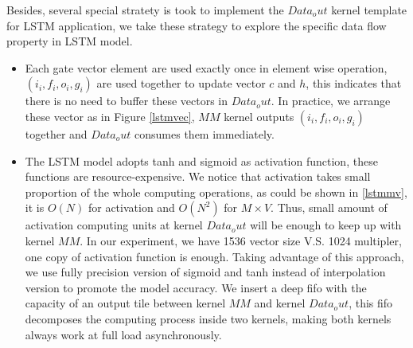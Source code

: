 \documentclass{acm_proc_article-sp-copy}
\begin{document}
Besides, several special stratety is took to implement the $Data_out$ kernel template for LSTM application, we take these strategy to explore the specific data flow property in LSTM model.
\begin{itemize}
\item Each gate vector element are used exactly once in element wise operation, $(i_i, f_i, o_i, g_i)$ are used together to update vector $c$ and $h$, this indicates that there is no need to buffer these vectors in $Data_out$. In practice, we arrange these vector as in Figure \ref{lstmvec}, $MM$ kernel outputs $(i_i, f_i, o_i, g_i)$ together and $Data_out$ consumes them immediately.
\item The LSTM model adopts tanh and sigmoid as activation function, these functions are resource-expensive. We notice that activation takes small proportion of the whole computing operations, as could be shown in \ref{lstmmv}, it is $O(N)$ for activation and $O(N^2)$ for $M \times V$. Thus, small amount of activation computing units at kernel $Data_out$ will be enough to keep up with kernel $MM$. In our experiment, we have 1536 vector size V.S. 1024 multipler, one copy of activation function is enough. Taking advantage of this approach, we use fully precision version of sigmoid and tanh instead of interpolation version to promote the model accuracy.
We insert a deep fifo with the capacity of an output tile between kernel $MM$ and kernel $Data_out$, this fifo decomposes the computing process inside two kernels, making both kernels always work at full load asynchronously.
\end{itemize}
\end{document}
